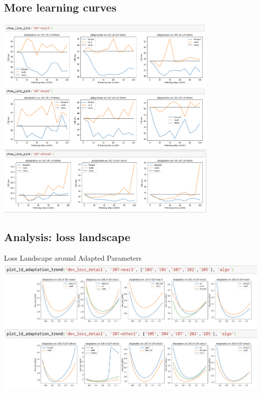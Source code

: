 \documentclass{beamer}
\begin{document}
\subsection{More learning curves}
\begin{frame}[t]
  \vspace{-1em}
  \center \includegraphics[width=0.8\textwidth]{fig/dev_cer_all.png}
\end{frame}
\label{losslandscape}
\subsection{Analysis: loss landscape}
\begin{frame}[t]{Loss Landscape around Adapted Parameters}
  \center \includegraphics[width=1.0\textwidth]{fig/loss_landscape.png}
\end{frame}
\end{document}
